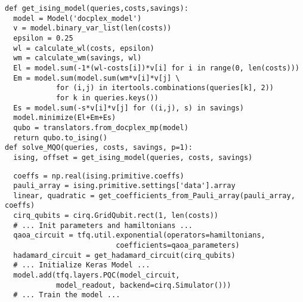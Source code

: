 \newsavebox\tqra\newsavebox\tqrb
\begin{lrbox}{\tqra}
\begin{minipage}{(\boxwidth-\hsep)/2}\lsttopcorr
\begin{lstlisting}
def get_ising_model(queries,costs,savings):
  model = Model('docplex_model')
  v = model.binary_var_list(len(costs))
  epsilon = 0.25
  wl = calculate_wl(costs, epsilon)
  wm = calculate_wm(savings, wl)
  El = model.sum(-1*(wl-costs[i])*v[i] for i in range(0, len(costs)))
  Em = model.sum(model.sum(wm*v[i]*v[j] \
            for (i,j) in itertools.combinations(queries[k], 2)) 
            for k in queries.keys())
  Es = model.sum(-s*v[i]*v[j] for ((i,j), s) in savings)
  model.minimize(El+Em+Es)  
  qubo = translators.from_docplex_mp(model)
  return qubo.to_ising()
def solve_MQO(queries, costs, savings, p=1):
  ising, offset = get_ising_model(queries, costs, savings)
\end{lstlisting}\vspace*{-1em}\end{minipage}
\end{lrbox}
\begin{lrbox}{\tqrb}
\begin{minipage}{(\boxwidth-\hsep)/2}\lsttopcorr
\begin{lstlisting}
  coeffs = np.real(ising.primitive.coeffs)
  pauli_array = ising.primitive.settings['data'].array
  linear, quadratic = get_coefficients_from_Pauli_array(pauli_array, coeffs)
  cirq_qubits = cirq.GridQubit.rect(1, len(costs))
  # ... Init parameters and hamiltonians ...
  qaoa_circuit = tfq.util.exponential(operators=hamiltonians,
                          coefficients=qaoa_parameters)
  hadamard_circuit = get_hadamard_circuit(cirq_qubits)
  # ... Initialize Keras Model ...
  model.add(tfq.layers.PQC(model_circuit,
            model_readout, backend=cirq.Simulator()))
  # ... Train the model ...
\end{lstlisting}\vspace*{-1em}\end{minipage}
\end{lrbox}

